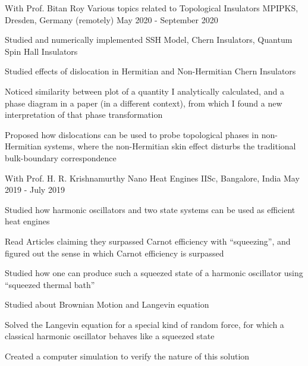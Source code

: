 \begin{cventries}
\cventry
{With Prof. Bitan Roy} %
{Various topics related to Topological Insulators} %
{MPIPKS, Dresden, Germany (remotely)} %
{May 2020 - September 2020} %
{
	\begin{cvitems} %
		\item {Studied and numerically implemented SSH Model, Chern Insulators, Quantum Spin Hall Insulators}
		\item {Studied effects of dislocation in Hermitian and Non-Hermitian Chern Insulators}
		\item {Noticed similarity between plot of a quantity I analytically calculated, and a phase diagram in a paper (in a different context), from which I found a new interpretation of that phase transformation}
		\item {Proposed how dislocations can be used to probe topological phases in non-Hermitian systems, where the non-Hermitian skin effect disturbs the traditional bulk-boundary correspondence}
	\end{cvitems}
}

  \cventry
    {With Prof. H. R. Krishnamurthy} %
    {Nano Heat Engines} %
    {IISc, Bangalore, India} %
    {May 2019 - July 2019} %
    {
      \begin{cvitems} %
        \item {Studied how harmonic oscillators and two state systems can be used as efficient heat engines}
        \item {Read Articles claiming they surpassed Carnot efficiency with ``squeezing'', and figured out the sense in which Carnot efficiency is surpassed}
        \item {Studied how one can produce such a squeezed state of a harmonic oscillator using ``squeezed thermal bath''}
        \item {Studied about Brownian Motion and Langevin equation}
        \item {Solved the Langevin equation for a special kind of random force, for which a classical harmonic oscillator behaves like a squeezed state}
        \item {Created a computer simulation to verify the nature of this solution}
      \end{cvitems}
    }


\end{cventries}

